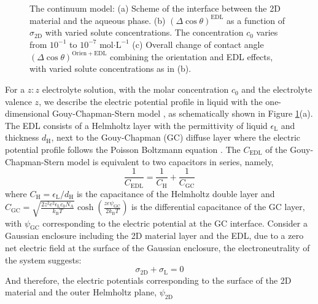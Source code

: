 \begin{figure}[htbp]
\centering
\caption{\label{fig:res-EDL} The continuum model: (a) Scheme of the
  interface between the 2D material and the aqueous phase. (b)
  \((\Delta\cos\theta)^{\mathrm{EDL}}\) as a function of
  \(\sigma_{\mathrm{2D}}\) with varied solute concentrations. The
  concentration \(c_{0}\) varies from \(10^{-1}\) to \(10^{-7}\)
  mol\(\cdot\mathrm{L}^{-1}\) (c) Overall change of contact angle
  \((\Delta \cos \theta)^{\mathrm{Orien+EDL}}\) combining the
  orientation and EDL effects, with varied solute concentrations as in
  (b).}
\end{figure}

For a \(z:z\) electrolyte solution, with the molar concentration \(c_{0}\)
and the electrolyte valence \(z\), we describe the electric potential
profile in liquid with the one-dimensional Gouy-Chapman-Stern model
\cite{Stern_1924_theory}, as schematically shown in Figure
\ref{fig:res-EDL}(a).  The EDL consists of a Helmholtz layer with the
permittivity of liquid \(\epsilon_{\mathrm{L}}\) and thickness
\(d_{\mathrm{H}}\), next to the Gouy-Chapman (GC) diffuse layer where
the electric potential profile follows the Poisson Boltzmann equation
\cite{bard_electrochemical_1980}. The \(C_{\mathrm{EDL}}\) of the
Gouy-Chapman-Stern model is equivalent to two capacitors in series,
namely,
\begin{equation}
\label{eqn-GCS-capacitance-series}
\frac{1}{C_{\mathrm{EDL}}} = \frac{1}{C_{\mathrm{H}}} + \frac{1}{C_{\mathrm{GC}}}
\end{equation}
where \(C_{\mathrm{H}}=\epsilon_{\mathrm{L}}/d_{\mathrm{H}}\) is the
capacitance of the Helmholtz double layer and
\(C_{\mathrm{GC}}=\sqrt{\frac{2z^{2}e^{2}\epsilon_{\mathrm{L}}c_{0}N_{\mathrm{A}}}{k_{\mathrm{B}}T}}
\cosh(\frac{ze\psi_{\mathrm{GC}}}{2k_{\mathrm{B}}T})\) is the
differential capacitance of the GC layer, with \(\psi_{\mathrm{GC}}\)
corresponding to the electric potential at the GC interface. Consider
a Gaussian enclosure including the 2D material layer and the EDL, due
to a zero net electric field at the surface of the Gaussian enclosure,
the electroneutrality of the system \cite{bard_electrochemical_1980}
suggests:
\begin{equation}
\label{eqn-neutrality}
\sigma_{\mathrm{2D}} + \sigma_{\mathrm{L}} = 0
\end{equation}
And therefore, the electric potentials corresponding to the surface of
the 2D material and the outer Helmholtz plane, \(\psi_{\mathrm{2D}}\)
